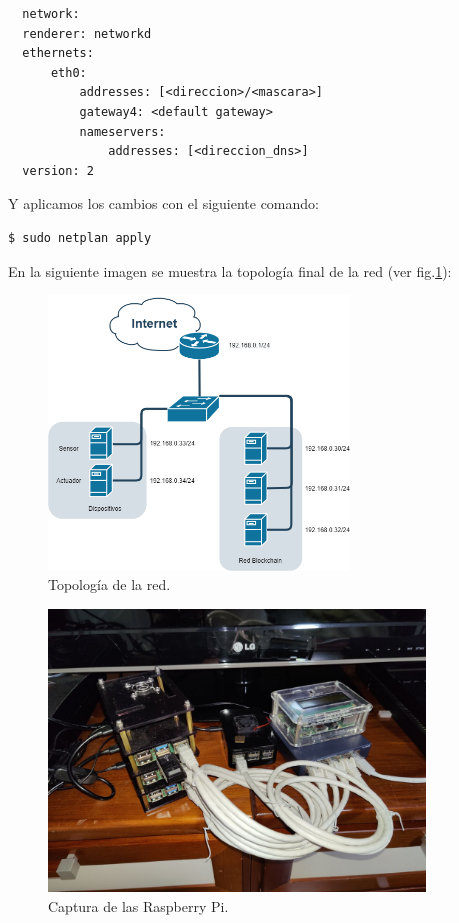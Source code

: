 \vspace{5mm}

\begin{lstlisting}
  network:
  renderer: networkd
  ethernets:
      eth0:
          addresses: [<direccion>/<mascara>]
          gateway4: <default gateway>
          nameservers:
              addresses: [<direccion_dns>]
  version: 2
\end{lstlisting}

\vspace{10mm}

\noindent Y aplicamos los cambios con el siguiente comando:

\begin{lstlisting}[language=bash]
  $ sudo netplan apply
\end{lstlisting}

\vspace{5mm}

\noindent En la siguiente imagen se muestra la topología final de la red (ver fig.\ref{fig:topologia-red}):

\begin{figure}[ht!]
  \centering
  \includegraphics[width=8cm]{imagenes/desarrollo/topologia_red}
  \caption{Topología de la red.}
  \label{fig:topologia-red}
\end{figure}

\begin{figure}[ht!]
  \centering
  \includegraphics[width=10cm]{imagenes/desarrollo/foto_raspberry}
  \caption{Captura de las Raspberry Pi.}
  \label{fig:captura-raspberry}
\end{figure}

